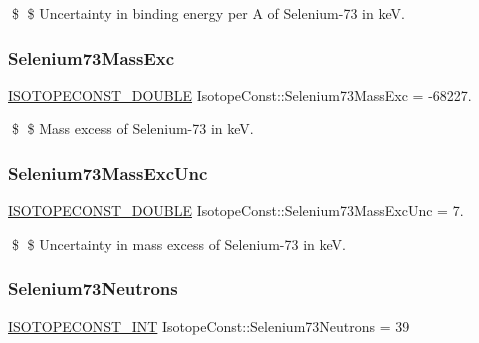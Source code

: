 \$ \$ Uncertainty in binding energy per A of Selenium-\/73 in keV. \mbox{\label{group___isotope_const-_selenium-_se73_ga4b6a256f5e3c10b14b9d1fe890f30c79}} 
\subsubsection{\texorpdfstring{Selenium73\+Mass\+Exc}{Selenium73MassExc}}
{\footnotesize\ttfamily \mbox{\hyperlink{group___isotope_const-_macros_ga8f45a7272ce02c0b4c65c44636ed719a}{I\+S\+O\+T\+O\+P\+E\+C\+O\+N\+S\+T\+\_\+\+D\+O\+U\+B\+LE}} Isotope\+Const\+::\+Selenium73\+Mass\+Exc = -\/68227.}

\$ \$ Mass excess of Selenium-\/73 in keV. \mbox{\label{group___isotope_const-_selenium-_se73_gaf455e49a80a26a92962984a92e77f6ae}} 
\subsubsection{\texorpdfstring{Selenium73\+Mass\+Exc\+Unc}{Selenium73MassExcUnc}}
{\footnotesize\ttfamily \mbox{\hyperlink{group___isotope_const-_macros_ga8f45a7272ce02c0b4c65c44636ed719a}{I\+S\+O\+T\+O\+P\+E\+C\+O\+N\+S\+T\+\_\+\+D\+O\+U\+B\+LE}} Isotope\+Const\+::\+Selenium73\+Mass\+Exc\+Unc = 7.}

\$ \$ Uncertainty in mass excess of Selenium-\/73 in keV. \mbox{\label{group___isotope_const-_selenium-_se73_ga42debdb894b43298ca719cca1743e03f}} 
\subsubsection{\texorpdfstring{Selenium73\+Neutrons}{Selenium73Neutrons}}
{\footnotesize\ttfamily \mbox{\hyperlink{group___isotope_const-_macros_ga5f18360b3e99483a35c32d789e62621c}{I\+S\+O\+T\+O\+P\+E\+C\+O\+N\+S\+T\+\_\+\+I\+NT}} Isotope\+Const\+::\+Selenium73\+Neutrons = 39}

